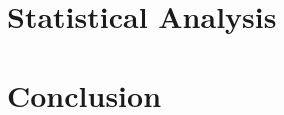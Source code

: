 \documentclass{outhesis}
\begin{document}
\chapter{Statistical Analysis}\label{sec:stat}


\chapter*{Conclusion}\label{sec:concl}






% 
% 

\end{document}

